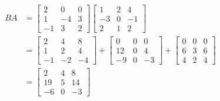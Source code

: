 \documentclass{article}
\begin{document}
\subsubsection{}
\begin{align*}
    BA & =
    \begin{bmatrix}
        2  & 0  & 0 \\
        1  & -4 & 3 \\
        -1 & 3  & 2
    \end{bmatrix}
    \begin{bmatrix}
        1  & 2 & 4  \\
        -3 & 0 & -1 \\
        2  & 1 & 2
    \end{bmatrix} \\
       & =
    \begin{bmatrix}
        2  & 4  & 8  \\
        1  & 2  & 4  \\
        -1 & -2 & -4
    \end{bmatrix} +
    \begin{bmatrix}
        0  & 0 & 0  \\
        12 & 0 & 4  \\
        -9 & 0 & -3
    \end{bmatrix} +
    \begin{bmatrix}
        0 & 0 & 0 \\
        6 & 3 & 6 \\
        4 & 2 & 4
    \end{bmatrix} \\
       & =
    \begin{bmatrix}
        2  & 4 & 8  \\
        19 & 5 & 14 \\
        -6 & 0 & -3
    \end{bmatrix}
\end{align*}

\subsubsection{}
\end{document}

